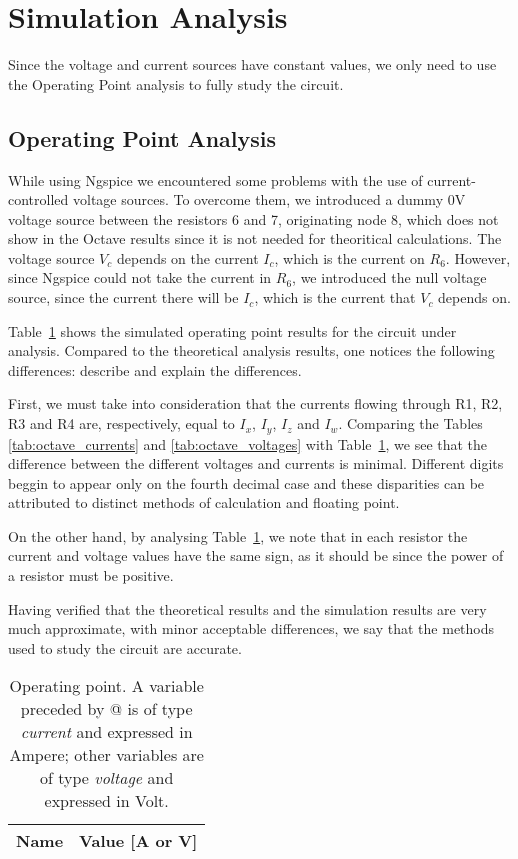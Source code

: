 \section{Simulation Analysis}
\label{sec:simulation}
\tab Since the voltage and current sources have constant values, we only need to use the Operating Point analysis to fully study the circuit.

\subsection{Operating Point Analysis}
\label{subsec:op_analysis}

\tab While using Ngspice we encountered some problems with the use of current-controlled voltage sources. To overcome them, we introduced a dummy 0V voltage source between the resistors 6 and 7, originating node 8, which does not show in the Octave results since it is not needed for theoritical calculations.
The voltage source $V_c$ depends on the current $I_c$, which is the current on $R_6$. However, since Ngspice could not take the current in $R_6$, we introduced the null voltage source, since the current there will be $I_c$, which is the current that $V_c$ depends on.

Table~\ref{tab:op} shows the simulated operating point results for the circuit
under analysis. Compared to the theoretical analysis results, one notices the
following differences: describe and explain the differences.

First, we must take into consideration that the currents flowing through R1, R2, R3 and R4 are, respectively, equal to $I_x$, $I_y$, $I_z$ and $I_w$.
Comparing the Tables \ref{tab:octave_currents} and \ref{tab:octave_voltages} with Table~\ref{tab:op}, we see that the difference between the different voltages and currents is minimal. Different digits beggin to appear only on the fourth decimal case and these disparities can be attributed to distinct methods of calculation and floating point.\par
On the other hand, by analysing Table~\ref{tab:op}, we note that in each resistor the current and voltage values have the same sign, as it should be since the power of a resistor must be positive. \par
Having verified that the theoretical results and the simulation results are very much approximate, with minor acceptable differences, we say that the methods used to study the circuit are accurate.


\begin{table}[h]
  \centering
  \begin{tabular}{|l|r|}
    \hline    
    {\bf Name} & {\bf Value [A or V]} \\ \hline
    
  \end{tabular}
  \caption{Operating point. A variable preceded by @ is of type {\em current}
    and expressed in Ampere; other variables are of type {\it voltage} and expressed in
    Volt.}
  \label{tab:op}
\end{table}



